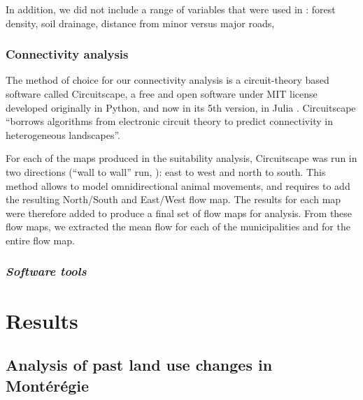 In addition, we did not include a range of variables that were used in \citeauthor{rayfield_priorisation_2018}: forest density, soil drainage, distance from minor versus major roads,   \\

\subsubsection{Connectivity analysis}

The method of choice for our connectivity analysis is a circuit-theory based software called Circuitscape, a free and open software under MIT license developed originally in Python, and now in its 5th version, in Julia \citep{circuitjulia}.  Circuitscape “borrows algorithms from electronic circuit theory to predict connectivity in heterogeneous landscapes”.

For each of the maps produced in the suitability analysis, Circuitscape was run in two directions (“wall to wall” run, \cite{mcrae_conserving_2016}): east to west and north to south. This method allows to model omnidirectional animal movements, and requires to add the resulting North/South and East/West flow map. The results for each map were therefore added to produce a final set of flow maps for analysis. From these flow maps, we extracted the mean flow for each of the municipalities and for the entire flow map. \\

\subsubsection*{\textit{Software tools}}

\section{Results}

\subsection{Analysis of past land use changes in Montérégie}


